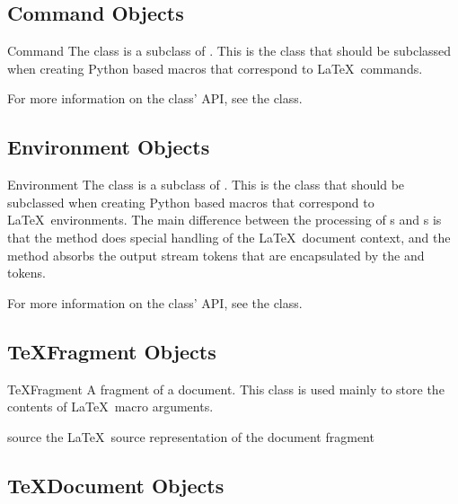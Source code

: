 \subsection{Command Objects}

\begin{classdesc}{Command}{}
The  class is a subclass of .  This is the class
that should be subclassed when creating Python based macros that correspond
to \LaTeX\ commands.

For more information on the  class' API, see the 
 class.
\end{classdesc}


\subsection{Environment Objects}

\begin{classdesc}{Environment}{}
The  class is a subclass of .  This is the
class that should be subclassed when creating Python based macros that 
correspond to \LaTeX\ environments.  The main difference between the 
processing of s and s is that the
 method does special handling of the \LaTeX\ document
context, and the  method absorbs the output stream tokens
that are encapsulated by the  and  tokens. 

For more information on the  class' API, see the 
 class.
\end{classdesc}


\subsection{TeXFragment Objects}

\begin{classdesc}{TeXFragment}{}
A fragment of a document.  This class is used mainly to store the contents
of \LaTeX\ macro arguments.
\end{classdesc}

\begin{memberdesc}[TeXFragment]{source}
the \LaTeX\ source representation of the document fragment
\end{memberdesc}


\subsection{TeXDocument Objects}\label{sec:texdocument-objects}

